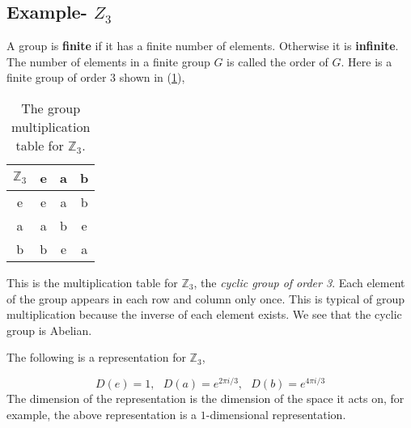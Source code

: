 \subsection{Example- $Z_3$}
A group is \textbf{finite} if it has a finite number of elements. Otherwise it is \textbf{infinite}. The number of elements in a finite group $G$ is called the order of $G$. Here is a finite group of order $3$ shown in (\ref{table:z3}),
\begin{table}
    \centering
    \begin{tabular}{|c|c|c|c|}
       \hline
         $\mathbb{Z}_3$& e & a & b \\
       \hline
       e & e & a & b \\
       \hline
       a & a & b & e \\
       \hline
       b & b & e & a\\
       \hline
    \end{tabular}
    \label{table:z3}
    \caption{The group multiplication table for $\mathbb{Z}_3$.}
\end{table}


This is the multiplication table for $\mathbb{Z}_3$, the \textit{cyclic group of order 3}. Each element of the group appears in each row and column only once. This is typical of group multiplication because the inverse of each element exists. We see that the cyclic group is Abelian. 

The following is a representation for $\mathbb{Z}_3$, 

\begin{equation}
    D(e) = 1, \ \ \ D(a) = e^{2\pi i/3}, \ \ \ D(b) = e^{4\pi i/3}
\end{equation}
The dimension of the representation is the dimension of the space it acts on, for example, the above representation is a $1$-dimensional representation. 
